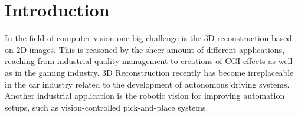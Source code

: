\documentclass  [
  paper    = a4,
  BCOR     = 10mm,
  twoside,
  fontsize = 12pt,
  fleqn,
  toc      = bibnumbered,
  toc      = listofnumbered,
  numbers  = noendperiod,
  headings = normal,
  listof   = leveldown,
  version  = 3.03
]                                       {scrreprt}
\begin{document}
  

  \tableofcontents


\chapter{Introduction}
In the field of computer vision one big challenge is the 3D reconstruction based on 2D images. This is reasoned by the sheer amount of different applications, reaching from industrial quality management to creations of CGI effects as well as in the gaming industry. 3D Reconstruction recently has become irreplaceable in the car industry related to the development of autonomous driving systems. Another industrial application is the robotic vision for improving automation setups, such as vision-controlled pick-and-place systems.\\
\end{document}
